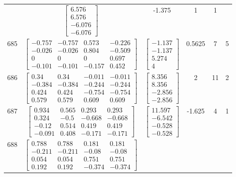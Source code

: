 \documentclass[a4paper,12pt]{article}
\begin{document}
\begin{tabular}{c c c c c c}
&
$\begin{bmatrix} 6.576 \\ 6.576 \\ -6.076 \\ -6.076 \end{bmatrix}$
&
-1.375
&
1
&
1
\\
685
&
$\begin{bmatrix} -0.757 & -0.757 & 0.573 & -0.226 \\ -0.026 & -0.026 & 0.804 & -0.509 \\ 0 & 0 & 0 & 0.697 \\ -0.101 & -0.101 & -0.157 & 0.452 \end{bmatrix}$
&
$\begin{bmatrix} -1.137 \\ -1.137 \\ 5.274 \\ 4 \end{bmatrix}$
&
0.5625
&
7
&
5
\\
686
&
$\begin{bmatrix} 0.34 & 0.34 & -0.011 & -0.011 \\ -0.384 & -0.384 & -0.244 & -0.244 \\ 0.424 & 0.424 & -0.754 & -0.754 \\ 0.579 & 0.579 & 0.609 & 0.609 \end{bmatrix}$
&
$\begin{bmatrix} 8.356 \\ 8.356 \\ -2.856 \\ -2.856 \end{bmatrix}$
&
2
&
11
&
2
\\
687
&
$\begin{bmatrix} 0.934 & 0.565 & 0.293 & 0.293 \\ 0.324 & -0.5 & -0.668 & -0.668 \\ -0.12 & 0.514 & 0.419 & 0.419 \\ -0.091 & 0.408 & -0.171 & -0.171 \end{bmatrix}$
&
$\begin{bmatrix} 11.597 \\ -6.542 \\ -0.528 \\ -0.528 \end{bmatrix}$
&
-1.625
&
4
&
1
\\
688
&
$\begin{bmatrix} 0.788 & 0.788 & 0.181 & 0.181 \\ -0.211 & -0.211 & -0.08 & -0.08 \\ 0.054 & 0.054 & 0.751 & 0.751 \\ 0.192 & 0.192 & -0.374 & -0.374 \end{bmatrix}$

\end{tabular}
\end{document}
